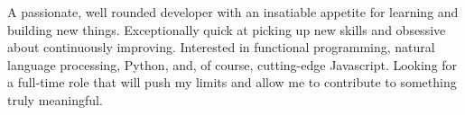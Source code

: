 

\begin{cvparagraph}

A passionate, well rounded developer with an insatiable appetite for learning and building new things. Exceptionally quick at picking up new skills and obsessive about continuously improving. Interested in functional programming, natural language processing, Python, and, of course, cutting-edge Javascript. Looking for a full-time role that will push my limits and allow me to contribute to something truly meaningful.
\end{cvparagraph}
